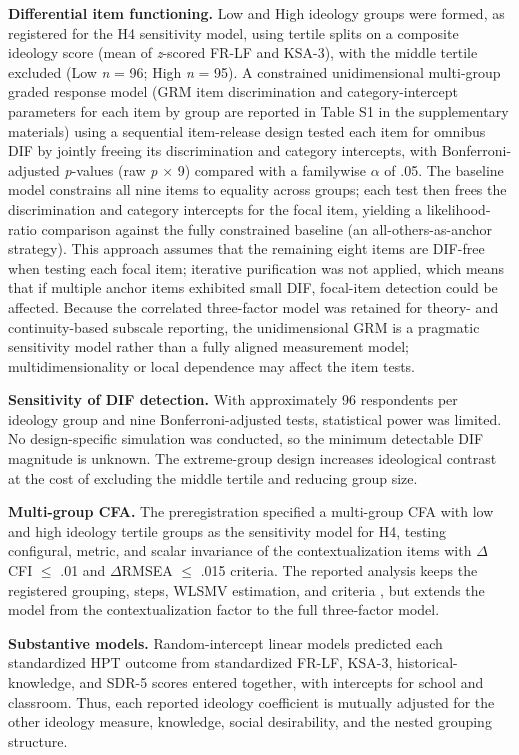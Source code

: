 \documentclass[PCJ,Unicode,screen,mode=plain]{cedram}
\begin{document}
\textbf{Differential item functioning.} Low and High ideology groups were formed, as registered for the H4 sensitivity model, using tertile splits on a composite ideology score (mean of \emph{z}-scored FR-LF and KSA-3), with the middle tertile excluded (Low \emph{n} = 96; High \emph{n} = 95). A constrained unidimensional multi-group graded response model (GRM item
discrimination and category-intercept parameters for each item by group are
reported in Table S1 in the supplementary materials) using a
sequential item-release design tested each item for omnibus DIF by
jointly freeing its discrimination and category intercepts, with
Bonferroni-adjusted \emph{p}-values (raw \emph{p} \(\times\) 9) compared
with a familywise \(\alpha\) of .05. The
baseline model constrains all nine items to equality across groups;
each test then frees the discrimination and category intercepts for
the focal item, yielding a likelihood-ratio comparison against the
fully constrained baseline (an all-others-as-anchor strategy). This
approach assumes that the remaining eight items are DIF-free when
testing each focal item; iterative purification was not applied, which
means that if multiple anchor items exhibited small DIF, focal-item
detection could be affected.
Because the correlated three-factor model was retained for theory- and
continuity-based subscale reporting, the unidimensional GRM
is a pragmatic sensitivity model rather than a fully aligned
measurement model; multidimensionality or local dependence may affect
the item tests.

\textbf{Sensitivity of DIF detection.} With approximately 96 respondents per ideology group and nine Bonferroni-adjusted tests, statistical power was limited. No design-specific simulation was conducted, so the minimum detectable DIF magnitude is unknown. The extreme-group design increases ideological contrast at the cost of excluding the middle tertile and reducing group size.

\textbf{Multi-group CFA.} The preregistration specified a multi-group CFA with low and high ideology tertile groups as the sensitivity model for H4, testing configural, metric, and scalar invariance of the contextualization items with \(\Delta\)CFI \(\leq\) .01 and \(\Delta\)RMSEA \(\leq\) .015 criteria. The reported analysis keeps the registered grouping, steps, WLSMV estimation, and criteria \citep{Chen2007,Cheung2002}, but extends the model from the contextualization factor to the full three-factor model.

\textbf{Substantive models.} Random-intercept linear models predicted each
standardized HPT outcome from standardized FR-LF, KSA-3, historical-knowledge,
and SDR-5 scores entered together, with intercepts for school and classroom.
Thus, each reported ideology coefficient is mutually adjusted for the other
ideology measure, knowledge, social desirability, and the nested grouping
structure.
\end{document}
